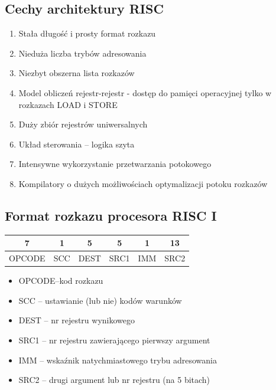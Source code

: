 \documentclass[a4paper,twoside]{article}
\begin{document}
\subsection{Cechy architektury RISC}
\begin{enumerate}
	\item Stała długość i prosty format rozkazu
	\item Nieduża liczba trybów adresowania
	\item Niezbyt obszerna lista rozkazów
	\item Model obliczeń rejestr-rejestr - dostęp do pamięci operacyjnej tylko w rozkazach LOAD i STORE
	\item Duży zbiór rejestrów uniwersalnych
	\item Układ sterowania – logika szyta
	\item Intensywne wykorzystanie przetwarzania potokowego
	\item Kompilatory o dużych możliwościach optymalizacji potoku rozkazów
\end{enumerate}

\subsection{Format rozkazu procesora RISC I}
\begin{table}[h]
	\begin{tabular}{clclll}
		\hline
		\multicolumn{1}{|c|}{7}      & \multicolumn{1}{c|}{1}   & \multicolumn{1}{c|}{5}    & \multicolumn{1}{c|}{5}    & \multicolumn{1}{c|}{1}   & \multicolumn{1}{c|}{13}   \\ \hline
		\multicolumn{1}{|c|}{OPCODE} & \multicolumn{1}{c|}{SCC} & \multicolumn{1}{c|}{DEST} & \multicolumn{1}{c|}{SRC1} & \multicolumn{1}{c|}{IMM} & \multicolumn{1}{c|}{SRC2} \\ \hline
	\end{tabular}
\end{table}
\begin{itemize}
	\item OPCODE–kod rozkazu
	\item SCC – ustawianie (lub nie) kodów warunków
	\item DEST – nr rejestru wynikowego
	\item SRC1 – nr rejestru zawierającego pierwszy argument
	\item IMM – wskaźnik natychmiastowego trybu adresowania
	\item SRC2 – drugi argument lub nr rejestru (na 5 bitach)
\end{itemize}
\end{document}
